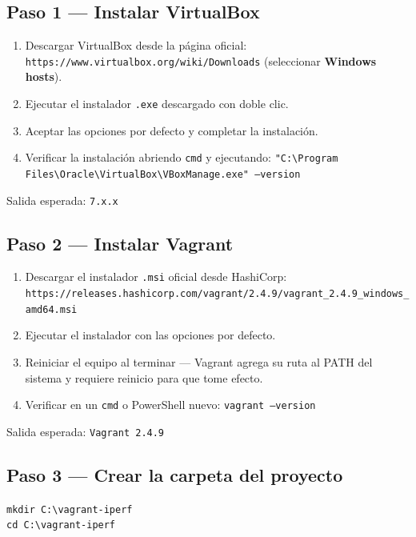 \documentclass[12pt]{article}
\begin{document}
\subsection{Paso 1 --- Instalar VirtualBox}

\begin{enumerate}
	\item Descargar VirtualBox desde la página oficial: \texttt{https://www.virtualbox.org/wiki/Downloads} (seleccionar \textbf{Windows hosts}).
	\item Ejecutar el instalador \texttt{.exe} descargado con doble clic.
	\item Aceptar las opciones por defecto y completar la instalación.
	\item Verificar la instalación abriendo \texttt{cmd} y ejecutando: \texttt{"C:\textbackslash Program Files\textbackslash Oracle\textbackslash VirtualBox\textbackslash VBoxManage.exe" --version}
\end{enumerate}

Salida esperada: \texttt{7.x.x}

\subsection{Paso 2 --- Instalar Vagrant}

\begin{enumerate}
	\item Descargar el instalador \texttt{.msi} oficial desde HashiCorp: \texttt{https://releases.hashicorp.com/vagrant/2.4.9/vagrant\_2.4.9\_windows\_amd64.msi}
	\item Ejecutar el instalador con las opciones por defecto.
	\item Reiniciar el equipo al terminar --- Vagrant agrega su ruta al PATH del sistema y requiere reinicio para que tome efecto.
	\item Verificar en un \texttt{cmd} o PowerShell nuevo: \texttt{vagrant --version}
\end{enumerate}

Salida esperada: \texttt{Vagrant 2.4.9}

\subsection{Paso 3 --- Crear la carpeta del proyecto}

\begin{center}
\texttt{mkdir C:\textbackslash vagrant-iperf} \\
\texttt{cd C:\textbackslash vagrant-iperf}
\end{center}
\end{document}
